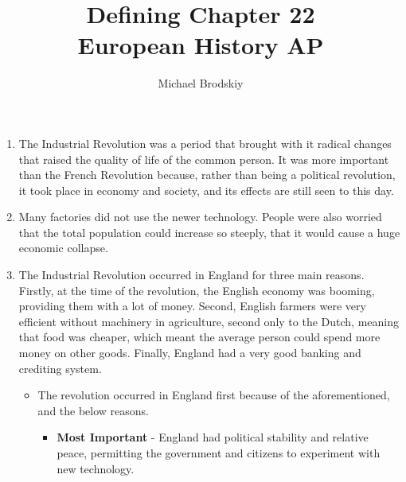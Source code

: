 \documentclass[12pt]{article}
\newcommand{\subtitle}[1]{%
  \posttitle{%
    \par\end{center}
    \begin{center}\large#1\end{center}
    \vskip0.5em}%
}
\begin{document}


\author{Michael Brodskiy}
\title{Defining Chapter 22\\European History AP}
\subtitle{Mrs Fisher}
\maketitle



\begin{enumerate}

\item The Industrial Revolution was a period that brought with it radical changes that raised the quality of life of the common person. It was more important than the French Revolution because, rather than being a political revolution, it took place in economy and society, and its effects are still seen to this day.

\item Many factories did not use the newer technology. People were also worried that the total population could increase so steeply, that it would cause a huge economic collapse.

\item The Industrial Revolution occurred in England for three main reasons. Firstly, at the time of the revolution, the English economy was booming, providing them with a lot of money. Second, English farmers were very efficient without machinery in agriculture, second only to the Dutch, meaning that food was cheaper, which meant the average person could spend more money on other goods. Finally, England had a very good banking and crediting system.\\


\begin{itemize}


\item The revolution occurred in England first because of the aforementioned, and the below reasons.\\


\begin{itemize}[label=$\circ$]

\item \textbf{Most Important} - England had political stability and relative peace, permitting the government and citizens to experiment with new technology.


\end{itemize}
\end{itemize}
\end{enumerate}
\end{document}
